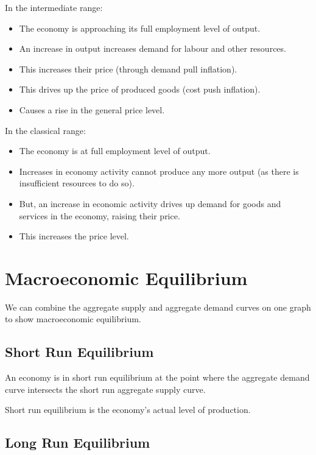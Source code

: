 \documentclass[a4paper,11pt]{article}
\begin{document}
In the intermediate range:

\begin{itemize}
\item The economy is approaching its full employment level of output.
\item An increase in output increases demand for labour and other resources.
\item This increases their price (through demand pull inflation).
\item This drives up the price of produced goods (cost push inflation).
\item Causes a rise in the general price level.
\end{itemize}

In the classical range:

\begin{itemize}
\item The economy is at full employment level of output.
\item Increases in economy activity cannot produce any more output (as there is
	insufficient resources to do so).
\item But, an increase in economic activity drives up demand for goods and
	services in the economy, raising their price.
\item This increases the price level.
\end{itemize}




\section{Macroeconomic Equilibrium}

We can combine the aggregate supply and aggregate demand curves on one graph to
show macroeconomic equilibrium.


\subsection{Short Run Equilibrium}


An economy is in short run equilibrium at the point where the aggregate demand
curve intersects the short run aggregate supply curve.

Short run equilibrium is the economy's actual level of production.


\subsection{Long Run Equilibrium}
\end{document}
